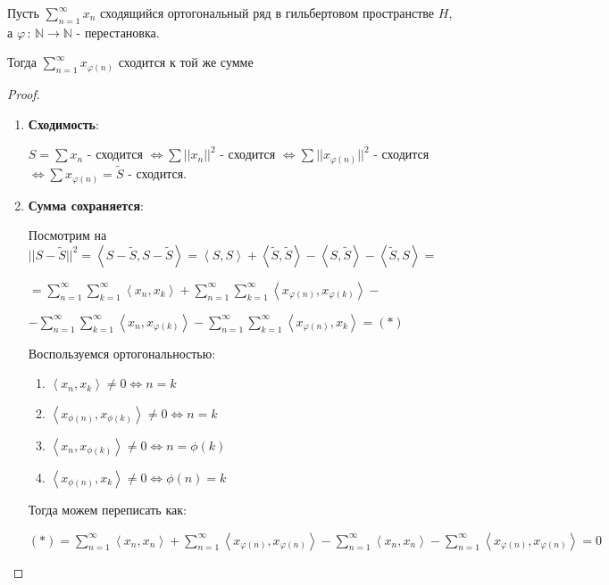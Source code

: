 \begin{consequence}
    Пусть $\sum_{n = 1}^{\infty} x_n$ сходящийся ортогональный ряд в гильбертовом пространстве $H$, а $\varphi \, : \, \mathbb{N} \to \mathbb{N}$ - перестановка.

    Тогда $\sum_{n = 1}^\infty x_{\varphi(n)} $ сходится к той же сумме
\end{consequence}

\begin{proof}
    \begin{enumerate}
        \item {
        \textbf{Сходимость}:

        $S = \sum x_n$ - сходится $\Longleftrightarrow \sum ||x_n||^2$ - сходится $\Longleftrightarrow \sum ||x_{\varphi(n)}||^2$ - сходится $\Longleftrightarrow \sum x_{\varphi(n)} = \tilde{S}$ - сходится.
        }
        \item {
        \textbf{Сумма сохраняется}:


        Посмотрим на $||S - \tilde{S}||^2 = \left <  S - \tilde{S}, S - \tilde{S} \right > = \left < S, S \right > + \left < \tilde{S}, \tilde{S} \right > - \left < S, \tilde{S} \right > - \left < \tilde{S}, S \right > = $

        $= \sum_{n = 1}^\infty \sum_{k = 1}^\infty \left < x_n, x_k \right > + \sum_{n = 1}^\infty \sum_{k = 1}^\infty \left < x_{\varphi(n)}, x_{\varphi(k)} \right > -$

        $- \sum_{n = 1}^\infty \sum_{k = 1}^\infty \left < x_n, x_{\varphi(k)} \right > - \sum_{n = 1}^\infty \sum_{k = 1}^\infty \left < x_{\varphi(n)}, x_k \right > = (*)$

        Воспользуемся ортогональностью:

        \begin{enumerate}
            \item {
                $\left< x_n, x_k \right> \neq 0 \Leftrightarrow n = k$
            }
            \item {
                $\left< x_{\phi(n)}, x_{\phi(k)} \right> \neq 0 \Leftrightarrow n = k$
            }
            \item {
                $\left< x_n, x_{\phi(k)} \right> \neq 0 \Leftrightarrow n = \phi(k)$
            }
            \item {
                $\left< x_{\phi(n)}, x_k \right> \neq 0 \Leftrightarrow \phi(n) = k$
            }
        \end{enumerate}

        Тогда можем переписать как:

        $(*) = \sum_{n = 1}^\infty \left < x_n , x_n \right > + \sum_{n = 1}^\infty \left < x_{\varphi(n)}, x_{\varphi(n)} \right > - \sum_{n = 1}^\infty \left < x_n, x_n \right > - \sum_{n = 1}^\infty \left < x_{\varphi(n)}, x_{\varphi(n)} \right > = 0 $
        }
    \end{enumerate}
\end{proof}

